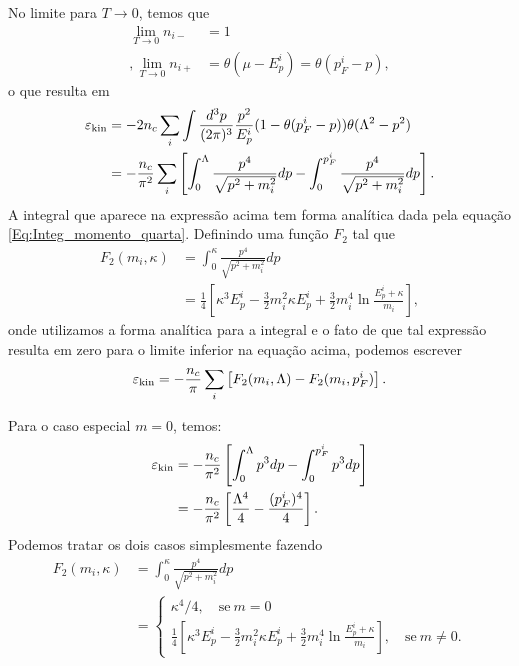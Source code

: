 No limite para $T \to 0$, temos que
\begin{align}
	\lim_{T \to 0} n_{i-} &= 1 \\,
	\lim_{T \to 0} n_{i+} &= \theta(\mu - E_p^i) = \theta(p_F^i - p),
\end{align}
%
o que resulta em
\begin{align}
	\varepsilon_{\rm{kin}} &= - 2 n_c \sum_i \int \frac{d^3p}{(2\pi)^3} \frac{p^2}{E_p^i} (1 - \theta(p_F^i - p))\theta(\Lambda^2 - p^2) \\
	&= -  \frac{n_c}{\pi^2} \sum_i \left[\int_0^\Lambda \frac{p^4}{\sqrt{p^2 + m_i^2}} dp - \int_0^{p_F^i} \frac{p^4}{\sqrt{p^2 + m_i^2}} dp\right].
\end{align}
%
A integral que aparece na expressão acima tem forma analítica dada pela equação \ref{Eq:Integ_momento_quarta}. Definindo uma função $F_2$ tal que
\begin{align}
	F_2(m_i, \kappa) &= \int_0^\kappa \frac{p^4}{\sqrt{p^2 + m_i^2}} dp \\
	&= \frac{1}{4}\left[\kappa^3 E_p^i - \frac{3}{2} m_i^2\kappa E_p^i + \frac{3}{2}m_i^4\ln \frac{E_p^i + \kappa}{m_i}\right],
\end{align}
%
onde utilizamos a forma analítica para a integral e o fato de que tal expressão resulta em zero para o limite inferior na equação acima, podemos escrever
\begin{equation}
	\varepsilon_{\rm{kin}} = - \frac{n_c}{\pi} \sum_i \left[F_2(m_i, \Lambda) - F_2(m_i, p_F^i)\right].
\end{equation}

Para o caso especial $m = 0$, temos:
\begin{align}
	\varepsilon_{\rm{kin}} &= - \frac{n_c}{\pi^2}\left[\int_0^\Lambda p^3 dp - \int_0^{p_F^i} p^3 dp\right] \\
	&= - \frac{n_c}{\pi^2}\left[\frac{\Lambda^4}{4} - \frac{(p_F^i)^4}{4}\right].
\end{align}
%
Podemos tratar os dois casos simplesmente fazendo
\begin{align}
	F_2(m_i, \kappa) &= \int_0^\kappa \frac{p^4}{\sqrt{p^2 + m_i^2}} dp \\
	&= \begin{cases} \kappa^4/4, \quad \textrm{se}~ m = 0 \\ \frac{1}{4}\left[\kappa^3 E_p^i - \frac{3}{2} m_i^2\kappa E_p^i + \frac{3}{2}m_i^4\ln \frac{E_p^i + \kappa}{m_i}\right], \quad \textrm{se}~ m\neq 0. \end{cases}
\end{align}

